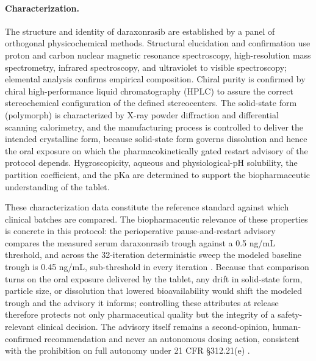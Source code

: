 \paragraph{Characterization.}
The structure and identity of daraxonrasib are established by a panel of
orthogonal physicochemical methods. Structural elucidation and confirmation use
proton and carbon nuclear magnetic resonance spectroscopy, high-resolution mass
spectrometry, infrared spectroscopy, and ultraviolet to visible spectroscopy;
elemental analysis confirms empirical composition. Chiral purity is confirmed by
chiral high-performance liquid chromatography (HPLC) to assure the correct
stereochemical configuration of the defined stereocenters. The solid-state form
(polymorph) is characterized by X-ray powder diffraction and differential
scanning calorimetry, and the manufacturing process is controlled to deliver the
intended crystalline form, because solid-state form governs dissolution and
hence the oral exposure on which the pharmacokinetically gated restart advisory
of the protocol depends. Hygroscopicity, aqueous and physiological-pH
solubility, the partition coefficient, and the pKa are determined to support the
biopharmaceutic understanding of the tablet. 

These characterization data
constitute the reference standard against which clinical batches are compared.
The biopharmaceutic relevance of these properties is concrete in this protocol:
the perioperative pause-and-restart advisory compares the measured serum
daraxonrasib trough against a 0.5 ng/mL threshold, and across the 32-iteration
deterministic sweep the modeled baseline trough is 0.45 ng/mL, sub-threshold in
every iteration \cite{daraxwhipple}. Because that comparison turns on the oral
exposure delivered by the tablet, any drift in solid-state form, particle size,
or dissolution that lowered bioavailability would shift the modeled trough and
the advisory it informs; controlling these attributes at release therefore
protects not only pharmaceutical quality but the integrity of a safety-relevant
clinical decision. The advisory itself remains a second-opinion, human-confirmed
recommendation and never an autonomous dosing action, consistent with the
prohibition on full autonomy under 21 CFR \S 312.21(e) \cite{onpremwhippl}.

